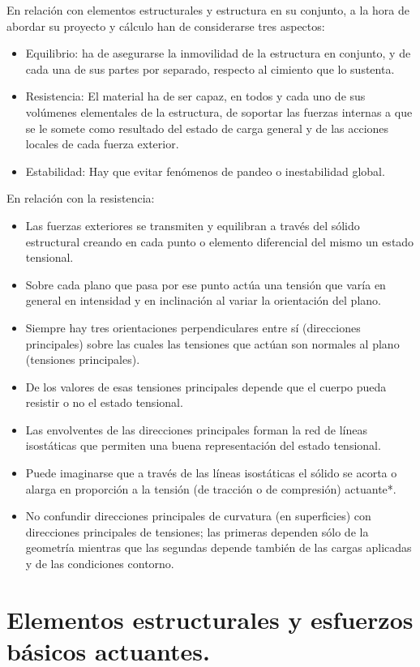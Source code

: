 En relación con elementos estructurales y estructura en su conjunto, a la hora de abordar su proyecto y cálculo han de considerarse tres aspectos:
\begin{itemize}
    \item Equilibrio: ha de asegurarse la inmovilidad de la estructura en conjunto, y de cada una de sus partes por separado, respecto al cimiento que lo sustenta.
    \item Resistencia: El material ha de ser capaz, en todos y cada uno de sus volúmenes elementales de la estructura, de soportar las fuerzas internas a que se le somete como resultado del estado de carga general y de las acciones locales de cada fuerza exterior.
    \item Estabilidad: Hay que evitar fenómenos de pandeo o inestabilidad global.
\end{itemize}

En relación con la resistencia:
\begin{itemize}
    \item Las fuerzas exteriores se transmiten y equilibran a través del sólido estructural creando en cada punto o elemento diferencial del mismo un estado tensional.
    \item Sobre cada plano que pasa por ese punto actúa una tensión que varía en general en intensidad y en inclinación al variar la orientación del plano.
    \item Siempre hay tres orientaciones perpendiculares entre sí (direcciones principales) sobre las cuales las tensiones que actúan son normales al plano (tensiones principales).
    \item De los valores de esas tensiones principales depende que el cuerpo pueda resistir o no el estado tensional.
    \item Las envolventes de las direcciones principales forman la red de líneas isostáticas que permiten una buena representación del estado tensional.
    \item Puede imaginarse que a través de las líneas isostáticas el sólido se acorta o alarga en proporción a la tensión (de tracción o de compresión) actuante*.
    \item No confundir direcciones principales de curvatura (en superficies) con direcciones principales de tensiones; las primeras dependen sólo de la geometría mientras que las segundas depende también de las cargas aplicadas y de las condiciones contorno. 
\end{itemize}

\section{Elementos estructurales y esfuerzos básicos actuantes.}
